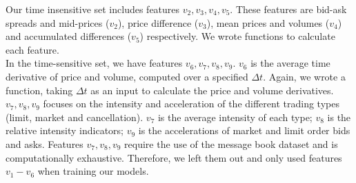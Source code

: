 \documentclass[11pt]{article}
\begin{document}
Our time insensitive set includes features $v_2, v_3, v_4, v_5$. These features are bid-ask spreads and mid-prices ($v_2$), price difference ($v_3$), mean prices and volumes ($v_4$) and accumulated differences ($v_5$) respectively. We wrote functions to calculate each feature. \\
In the time-sensitive set, we have features $v_6, v_7, v_8, v_9$. $v_6$ is the average time derivative of price and volume, computed over a specified $\Delta t$. Again, we wrote a function, taking $\Delta t$ as an input to calculate the price and volume derivatives. $v_7, v_8, v_9$ focuses on the intensity and acceleration of the different trading types (limit, market and cancellation). $v_7$ is the average intensity of each type; $v_8$ is the relative intensity indicators; $v_9$ is the accelerations of market and limit order bids and asks. Features $v_7, v_8, v_9$ require the use of the message book dataset and is computationally exhaustive. Therefore, we left them out and only used features $v_1 - v_6$ when training our models.
\end{document}
